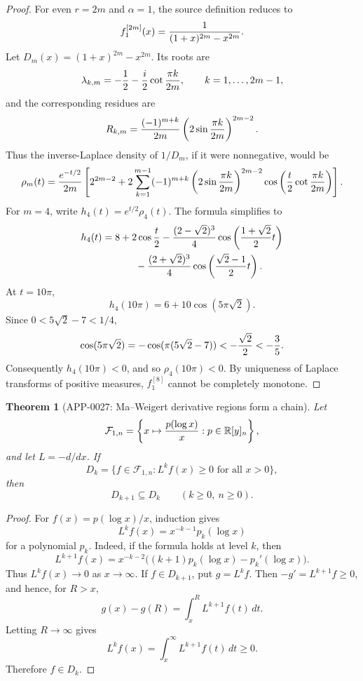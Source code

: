 \documentclass[11pt]{article}
\numberwithin{equation}{section}
\newtheorem{theorem}{Theorem}[section]
\theoremstyle{definition}
\theoremstyle{remark}
\newcommand{\1}{\mathbf 1}
\begin{document}
\begin{proof}
For even \(r=2m\) and \(\alpha=1\), the source definition reduces to
\[
 f^{[2m]}_1(x)={1\over(1+x)^{2m}-x^{2m}}.
\]
Let \(D_m(x)=(1+x)^{2m}-x^{2m}\).  Its roots are
\[
 \lambda_{k,m}=-{1\over2}-{i\over2}\cot{\pi k\over 2m},
 \qquad k=1,\ldots,2m-1,
\]
and the corresponding residues are
\[
 R_{k,m}={(-1)^{m+k}\over2m}
 \left(2\sin{\pi k\over2m}\right)^{2m-2}.
\]
Thus the inverse-Laplace density of \(1/D_m\), if it were nonnegative, would
be
\[
 \rho_m(t)={e^{-t/2}\over2m}
 \left[
 2^{2m-2}
 +2\sum_{k=1}^{m-1}(-1)^{m+k}
 \left(2\sin{\pi k\over2m}\right)^{2m-2}
 \cos\left({t\over2}\cot{\pi k\over2m}\right)
 \right].
\]
For \(m=4\), write \(h_4(t)=e^{t/2}\rho_4(t)\).  The formula simplifies to
\[
\begin{aligned}
 h_4(t)
 &=8+2\cos{t\over2}
 -{(2-\sqrt2)^3\over4}\cos\left({1+\sqrt2\over2}t\right) \\
 &\hspace{1.2cm}
 -{(2+\sqrt2)^3\over4}\cos\left({\sqrt2-1\over2}t\right).
\end{aligned}
\]
At \(t=10\pi\),
\[
 h_4(10\pi)=6+10\cos(5\pi\sqrt2).
\]
Since \(0<5\sqrt2-7<1/4\),
\[
 \cos(5\pi\sqrt2)=-\cos(\pi(5\sqrt2-7))
 <-{\sqrt2\over2}<-{3\over5}.
\]
Consequently \(h_4(10\pi)<0\), and so \(\rho_4(10\pi)<0\).  By uniqueness of
Laplace transforms of positive measures, \(f^{[8]}_1\) cannot be completely
monotone.
\end{proof}

\begin{theorem}[APP-0027: Ma--Weigert derivative regions form a chain]
\label{thm:app27-ma-weigert-chain}
Let
\[
 \mathcal F_{1,n}
 =
 \left\{x\mapsto {p(\log x)\over x}:p\in\mathbb R[y]_n\right\},
\]
and let \(L=-d/dx\).  If
\[
 D_k=\{f\in\mathcal F_{1,n}:L^kf(x)\ge0\text{ for all }x>0\},
\]
then
\[
 D_{k+1}\subseteq D_k
 \qquad(k\ge0,\ n\ge0).
\]
\end{theorem}

\begin{proof}
For \(f(x)=p(\log x)/x\), induction gives
\[
 L^k f(x)=x^{-k-1}p_k(\log x)
\]
for a polynomial \(p_k\).  Indeed, if the formula holds at level \(k\), then
\[
 L^{k+1}f(x)
 =x^{-k-2}\bigl((k+1)p_k(\log x)-p_k'(\log x)\bigr).
\]
Thus \(L^k f(x)\to0\) as \(x\to\infty\).  If \(f\in D_{k+1}\), put
\(g=L^k f\).  Then \(-g'=L^{k+1}f\ge0\), and hence, for \(R>x\),
\[
 g(x)-g(R)=\int_x^R L^{k+1}f(t)\,dt .
\]
Letting \(R\to\infty\) gives
\[
 L^k f(x)=\int_x^\infty L^{k+1}f(t)\,dt\ge0.
\]
Therefore \(f\in D_k\).
\end{proof}
\end{document}
